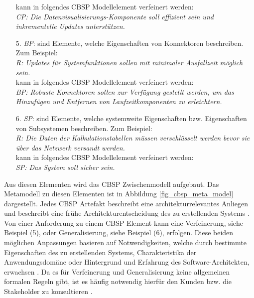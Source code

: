 \begin{itemize}
	kann in folgendes CBSP Modellelement verfeinert werden: \\
	\textit{CP: Die Datenvisualisierungs-Komponente soll effizient sein und inkrementelle Updates unterstützen.} \cite{Gru01}
\item[5.] \textit{BP}: sind Elemente, welche Eigenschaften von Konnektoren beschreiben. Zum Beispiel: \\
	\textit{R: Updates für Systemfunktionen sollen mit minimaler Ausfallzeit möglich sein.} \\
	kann in folgendes CBSP Modellelement verfeinert werden: \\
	\textit{BP: Robuste Konnektoren sollen zur Verfügung gestellt werden, um das Hinzufügen und Entfernen von Laufzeitkomponenten zu erleichtern.} \cite{Gru01}
\item[6.] \textit{SP}: sind Elemente, welche systemweite Eigenschaften bzw. Eigenschaften von Subsystemen beschreiben. Zum Beispiel: \\
	\textit{R: Die Daten der Kalkulationstabellen müssen verschlüsselt werden bevor sie über das Netzwerk versandt werden.} \\
	kann in folgendes CBSP Modellelement verfeinert werden: \\
	\textit{SP: Das System soll sicher sein.} \cite{Gru01} \\
\end{itemize}

Aus diesen Elementen wird das CBSP Zwischenmodell aufgebaut. Das Metamodell zu diesen Elementen ist in Abbildung \ref{fig_cbsp_meta_model} dargestellt. Jedes CBSP Artefakt beschreibt eine architekturrelevantes Anliegen und beschreibt eine frühe Architekturentscheidung des zu erstellenden Systems \cite{Gru01}. \\

Von einer Anforderung zu einem CBSP Element kann eine Verfeinerung, siehe Beispiel (5), oder Generalisierung, siehe Beispiel (6), erfolgen. Diese beiden möglichen Anpassungen basieren auf Notwendigkeiten, welche durch bestimmte Eigenschaften des zu erstellenden Systems, Charakteristika der Anwendungsdomäne oder Hintergrund und Erfahrung des Software-Architekten, erwachsen \cite{Gru01}. Da es für Verfeinerung und Generalisierung keine allgemeinen formalen Regeln gibt, ist es häufig notwendig hierfür den Kunden bzw. die Stakeholder zu konsultieren \cite{Gru01}. 

